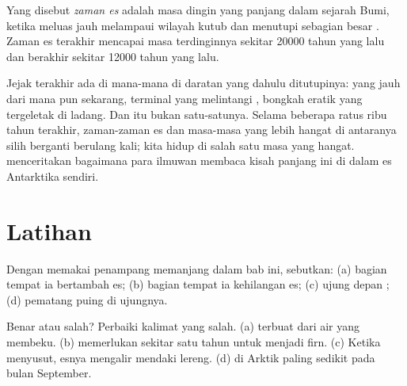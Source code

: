 \begin{definition}[Zaman es]\label{def:g8:ice-on-earth:ice-age}
Yang disebut \emph{zaman es} adalah masa dingin yang
panjang dalam sejarah Bumi, ketika  meluas jauh melampaui
wilayah kutub dan menutupi sebagian besar . Zaman es terakhir
mencapai masa terdinginnya sekitar \num{20000} tahun yang lalu dan
berakhir sekitar \num{12000} tahun yang lalu.
\end{definition}

Jejak  terakhir ada di mana-mana di daratan yang dahulu
ditutupinya:  yang jauh dari  mana pun sekarang,
 terminal yang melintangi , bongkah eratik yang tergeletak di
ladang. Dan  itu bukan satu-satunya. Selama beberapa ratus ribu
tahun terakhir, zaman-zaman es dan masa-masa yang lebih hangat di antaranya
silih berganti berulang kali; kita hidup di salah satu masa yang hangat.
 menceritakan bagaimana para ilmuwan
membaca kisah panjang ini di dalam es Antarktika sendiri.

\section{Latihan}

\begin{exercise}[$\star$]\label{exo:g8:ice-on-earth:1}
Dengan memakai penampang memanjang  dalam bab ini, sebutkan:
(a) bagian  tempat ia bertambah es; (b) bagian tempat ia
kehilangan es; (c) ujung depan ; (d) pematang puing  di
ujungnya.
\end{exercise}

\begin{exercise}[$\star$]\label{exo:g8:ice-on-earth:2}
Benar atau salah? Perbaiki kalimat yang salah. (a)  terbuat dari
air  yang membeku. (b)  memerlukan sekitar satu tahun untuk
menjadi firn. (c) Ketika  menyusut, esnya mengalir mendaki lereng.
(d)  di Arktik paling sedikit pada bulan September.
\end{exercise}

